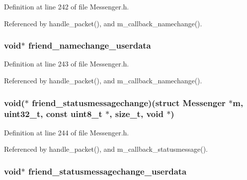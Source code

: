 Definition at line 242 of file Messenger.\+h.



Referenced by handle\+\_\+packet(), and m\+\_\+callback\+\_\+namechange().

\hypertarget{struct_messenger_a0a5f95c8ffcd6a9a0dafd21c34be2e0a}{
\subsubsection[{friend\+\_\+namechange\+\_\+userdata}]{\setlength{\rightskip}{0pt plus 5cm}void$\ast$ friend\+\_\+namechange\+\_\+userdata}}\label{struct_messenger_a0a5f95c8ffcd6a9a0dafd21c34be2e0a}


Definition at line 243 of file Messenger.\+h.



Referenced by handle\+\_\+packet(), and m\+\_\+callback\+\_\+namechange().

\hypertarget{struct_messenger_a5badb1433338f70899baee5abcf5f0a5}{
\subsubsection[{friend\+\_\+statusmessagechange}]{\setlength{\rightskip}{0pt plus 5cm}void($\ast$ friend\+\_\+statusmessagechange)(struct {\bf Messenger} $\ast${\bf m}, uint32\+\_\+t, const uint8\+\_\+t $\ast$, size\+\_\+t, void $\ast$)}}\label{struct_messenger_a5badb1433338f70899baee5abcf5f0a5}


Definition at line 244 of file Messenger.\+h.



Referenced by handle\+\_\+packet(), and m\+\_\+callback\+\_\+statusmessage().

\hypertarget{struct_messenger_adeec8efd452cd609070c2eee12826fb9}{
\subsubsection[{friend\+\_\+statusmessagechange\+\_\+userdata}]{\setlength{\rightskip}{0pt plus 5cm}void$\ast$ friend\+\_\+statusmessagechange\+\_\+userdata}}\label{struct_messenger_adeec8efd452cd609070c2eee12826fb9}


